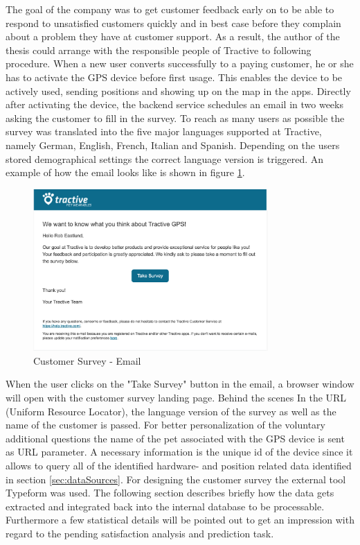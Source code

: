 The goal of the company was to get customer feedback early on to be able to respond to unsatisfied customers quickly and in best case before they complain about a problem they have at customer support. As a result, the author of the thesis could arrange with the responsible people of Tractive to following procedure. When a new user converts successfully to a paying customer, he or she has to activate the GPS device before first usage. This enables the device to be actively used, sending positions and showing up on the map in the apps. Directly after activating the device, the backend service schedules an email in two weeks asking the customer to fill in the survey. To reach as many users as possible the survey was translated into the five major languages supported at Tractive, namely German, English, French, Italian and Spanish. Depending on the users stored demographical settings the correct language version is triggered. An example of how the email looks like is shown in figure \ref{fig:customerSurveyEmail}.

\begin{figure}
 	\centering
 		\includegraphics[width=0.8\textwidth]{img/customerSurveyEmail.png}
 	\caption{Customer Survey - Email}
 	\label{fig:customerSurveyEmail}
\end{figure} 

When the user clicks on the "Take Survey" button in the email, a browser window will open with the customer survey landing page. Behind the scenes In the URL (Uniform Resource Locator), the language version of the survey as well as the name of the customer is passed. For better personalization of the voluntary additional questions the name of the pet associated with the GPS device is sent as URL parameter. A necessary information is the unique id of the device since it allows to query all of the identified hardware- and position related data identified in section \ref{sec:dataSources}. For designing the customer survey the external tool Typeform was used. The following section describes briefly how the data gets extracted and integrated back into the internal database to be processable. Furthermore a few statistical details will be pointed out to get an impression with regard to the pending satisfaction analysis and prediction task.

